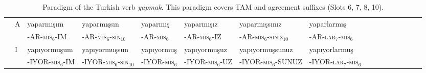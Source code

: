 \documentclass[11pt,letterpaper]{article}
\begin{document}
\begin{table}
{\begin{tabular}{ll||llllllllllllll}
               & A & yaparmışım &	yaparmışsın &	yaparmış &	yaparmışız &	yaparmışsınız& 	yaparlarmış \\ 
            &  & -AR-\textsc{mis}$_6$-IM &	-AR-\textsc{mis}$_6$-\textsc{sin}$_{10}$ &	-AR-\textsc{mis}$_6$ &	-AR-\textsc{mis}$_6$-IZ &	-AR-\textsc{mis}$_6$-\textsc{siniz}$_{10}$& 	-AR-\textsc{lar}$_{7}$-\textsc{mis}$_6$ \\ \hline
               & I & yapıyormuşum &	yapıyormuşsun &	yapıyormuş &	yapıyormuşuz &	yapıyormuşsunuz &	yapıyorlarmuş \\
               &              & -IYOR-\textsc{mis}$_6$-IM &	-IYOR-\textsc{mis}$_6$-\textsc{sin}$_{10}$ &	-IYOR-\textsc{mis}$_6$ &	-IYOR-\textsc{mis}$_6$-UZ &	-IYOR-\textsc{mis}$_6$-SUNUZ &	-IYOR-\textsc{lar}$_{7}$-\textsc{mis}$_6$ \\
\end{tabular}
}
\caption{Paradigm of the Turkish verb \textit{yapmak}. This paradigm covers TAM and agreement suffixes (Slots 6, 7, 8, 10).}\label{tab:turkish-yapmak}
\end{table}
\end{document}
